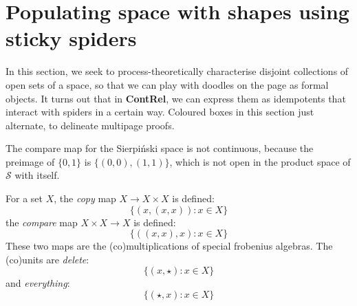 \section{Populating space with shapes using sticky spiders}\label{sec:stickyspider}


In this section, we seek to process-theoretically characterise disjoint collections of open sets of a space, so that we can play with doodles on the page as formal objects. It turns out that in \textbf{ContRel}, we can express them as idempotents that interact with spiders in a certain way. Coloured boxes in this section just alternate, to delineate multipage proofs.

\begin{example}\label{ex:compnotspider}
The compare map for the Sierpi\'{n}ski space is not continuous, because the preimage of $\{0,1\}$ is $\{(0,0),(1,1)\}$, which is not open in the product space of $\mathcal{S}$ with itself.
\end{example}

\begin{rem}
For a set $X$, the \emph{copy} map $X \rightarrow X \times X$ is defined:
\[\{(x,(x,x)) : x \in X \}\]
the \emph{compare} map $X \times X \rightarrow X$ is defined:
\[\{((x,x),x) : x \in X \}\]
These two maps are the (co)multiplications of special frobenius algebras. The (co)units are \emph{delete}:
\[\{(x,\star) : x \in X\}\]
and \emph{everything}:
\[\{(\star,x) : x \in X\}\]
\end{rem}

\newpage

